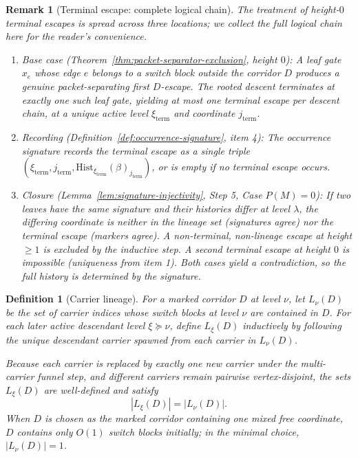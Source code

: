 \documentclass[11pt]{article}
\newtheorem{definition}[theorem]{Definition}
\newtheorem{remark}[theorem]{Remark}
\begin{document}
\begin{remark}[Terminal escape: complete logical chain]
\label{rem:terminal-escape-chain}
The treatment of height-$0$ terminal escapes is spread across three
locations; we collect the full logical chain here for the reader's
convenience.
\begin{enumerate}
\item \emph{Base case
(Theorem~\ref{thm:packet-separator-exclusion}, height $0$):}
A leaf gate $x_e$ whose edge $e$ belongs to a switch block outside the
corridor $D$ produces a genuine packet-separating first $D$-escape.
The rooted descent terminates at exactly one such leaf gate, yielding
\emph{at most one} terminal escape per descent chain, at a unique
active level $\xi_{\mathrm{term}}$ and coordinate
$j_{\mathrm{term}}$.
\item \emph{Recording
(Definition~\ref{def:occurrence-signature}, item 4):}
The occurrence signature records the terminal escape as a single triple
$(\xi_{\mathrm{term}}, j_{\mathrm{term}},
\mathrm{Hist}_{\xi_{\mathrm{term}}}(\beta)_{j_{\mathrm{term}}})$,
or is empty if no terminal escape occurs.
\item \emph{Closure
(Lemma~\ref{lem:signature-injectivity}, Step 5, Case $P(M) = 0$):}
If two leaves have the same signature and their histories differ at
level $\lambda$, the differing coordinate is neither in the lineage
set (signatures agree) nor the terminal escape (markers agree).
A non-terminal, non-lineage escape at height $\ge 1$ is excluded by
the inductive step.  A second terminal escape at height $0$ is
impossible (uniqueness from item 1).  Both cases yield a
contradiction, so the full history is determined by the signature.
\end{enumerate}
\end{remark}

\begin{definition}[Carrier lineage]
\label{def:carrier-lineage}
For a marked corridor $D$ at level $\nu$, let $L_\nu(D)$ be the set of
carrier indices whose switch blocks at level $\nu$ are contained in $D$.
For each later active descendant level $\xi \succeq \nu$, define
$L_\xi(D)$ inductively by following the unique descendant carrier spawned
from each carrier in $L_\nu(D)$.

Because each carrier is replaced by exactly one new carrier under the
multi-carrier funnel step, and different carriers remain pairwise
vertex-disjoint, the sets $L_\xi(D)$ are well-defined and satisfy
\[
|L_\xi(D)| = |L_\nu(D)|.
\]
When $D$ is chosen as the marked corridor containing one mixed free
coordinate, $D$ contains only $O(1)$ switch blocks initially; in the
minimal choice, $|L_\nu(D)| = 1$.
\end{definition}
\end{document}
